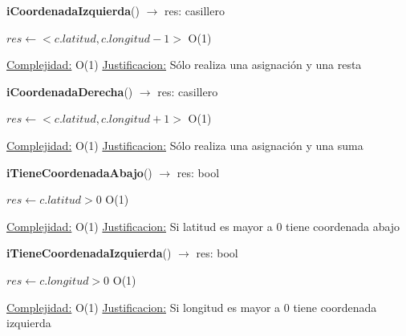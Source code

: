 \begin{Algoritmos}
\begin{algorithm}[H]{\textbf{iCoordenadaIzquierda}() $\to$ res: casillero}
	\begin{algorithmic}[1]
		\State $res \gets <c.latitud, c.longitud - 1>$ \Comment O(1)
		
		\medskip
		\Statex \underline{Complejidad:} O(1)
			\Statex \underline{Justificacion:} Sólo realiza una asignación y una resta
	\end{algorithmic}
\end{algorithm}


\begin{algorithm}[H]{\textbf{iCoordenadaDerecha}() $\to$ res: casillero}
	\begin{algorithmic}[1]
		\State $res \gets <c.latitud, c.longitud + 1>$ \Comment O(1)
		
		\medskip
		\Statex \underline{Complejidad:} O(1)
			\Statex \underline{Justificacion:} Sólo realiza una asignación y una suma
	\end{algorithmic}
\end{algorithm}

\begin{algorithm}[H]{\textbf{iTieneCoordenadaAbajo}() $\to$ res: bool}
	\begin{algorithmic}[1]
		\State $res \gets c.latitud > 0$ \Comment O(1)
		
		\medskip
		\Statex \underline{Complejidad:} O(1)
			\Statex \underline{Justificacion:} Si latitud es mayor a 0 tiene coordenada abajo
	\end{algorithmic}
\end{algorithm}

\begin{algorithm}[H]{\textbf{iTieneCoordenadaIzquierda}() $\to$ res: bool}
	\begin{algorithmic}[1]
		\State $res \gets c.longitud > 0$ \Comment O(1)
		
		\medskip
		\Statex \underline{Complejidad:} O(1)
			\Statex \underline{Justificacion:} Si longitud es mayor a 0 tiene coordenada izquierda
	\end{algorithmic}
\end{algorithm}

\end{Algoritmos}
